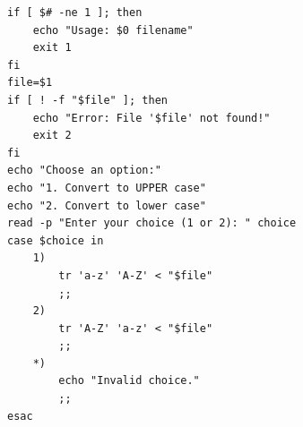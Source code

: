 \begin{verbatim}
if [ $# -ne 1 ]; then
    echo "Usage: $0 filename"
    exit 1
fi
file=$1
if [ ! -f "$file" ]; then
    echo "Error: File '$file' not found!"
    exit 2
fi
echo "Choose an option:"
echo "1. Convert to UPPER case"
echo "2. Convert to lower case"
read -p "Enter your choice (1 or 2): " choice
case $choice in
    1)
        tr 'a-z' 'A-Z' < "$file"
        ;;
    2)
        tr 'A-Z' 'a-z' < "$file"
        ;;
    *)
        echo "Invalid choice."
        ;;
esac
\end{verbatim}